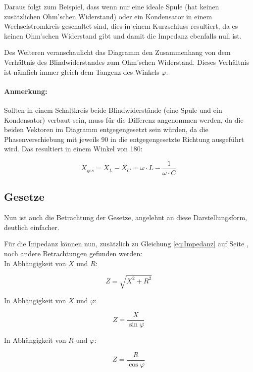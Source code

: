 
\vspace{11pt}

Daraus folgt zum Beispiel, dass wenn nur eine ideale Spule (hat keinen zusätzlichen Ohm'schen Widerstand) oder ein Kondensator in einem Wechselstromkreis geschaltet sind, dies in einem Kurzschluss resultiert, da es keinen Ohm'schen Widerstand gibt und damit die Impedanz ebenfalls null ist.

Des Weiteren veranschaulicht das Diagramm den Zusammenhang von dem Verhältnis des Blindwiderstandes zum Ohm'schen Widerstand. Dieses Verhältnis ist nämlich immer gleich dem Tangenz des Winkels $\varphi$.

\paragraph{Anmerkung:}

Sollten in einem Schaltkreis beide Blindwiderstände (eine Spule und ein Kondensator) verbaut sein, muss für die Differenz angenommen werden, da die beiden Vektoren im Diagramm entgegengesetzt sein würden, da die Phasenverschiebung mit jeweils 90\degree{} in die entgegengesetzte Richtung ausgeführt wird. Das resultiert in einem Winkel von 180\degree :

\begin{equation}	\label{eq:BlindwiderstandSumme}
	X_{ges} = X_L - X_C = \omega \cdot L - \frac{1}{\omega \cdot C}
\end{equation}



\subsection{Gesetze}	\label{subsec:WiderstaendeGesetzte}

Nun ist auch die Betrachtung der Gesetze, angelehnt an diese Darstellungsform, deutlich einfacher.


Für die Impedanz können nun, zusätzlich zu Gleichung \ref{eq:Impedanz} auf Seite \pageref{eq:Impedanz}, noch andere Betrachtungen gefunden werden: \\ In Abhängigkeit von $X$ und $R$:

\begin{equation}	\label{eq:ImepdanzXR}
	Z = \sqrt{X^2 + R^2}
\end{equation}


\hspace{-6mm}In Abhängigkeit von $X$ und $\varphi$:

\begin{equation}	\label{eq:ImepdanzXphi}
	Z = \frac{X}{\sin\varphi}
\end{equation}


\hspace{-6mm}In Abhängigkeit von $R$ und $\varphi$:

\begin{equation}	\label{eq:ImepdanzRphi}
	Z = \frac{R}{\cos\varphi}
\end{equation}









